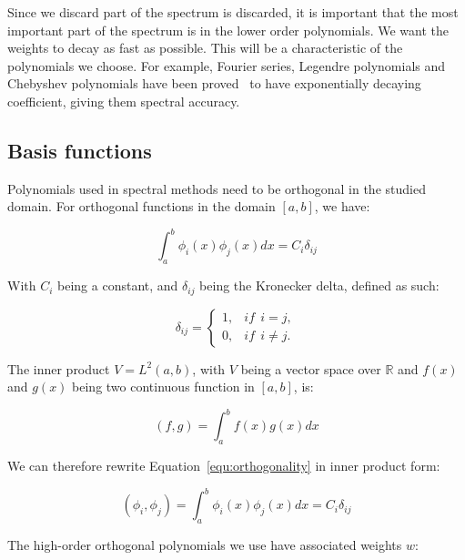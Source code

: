 Since we discard part of the spectrum is discarded, it is important that the most important part of
the spectrum is in the lower order polynomials. We want the weights to decay as fast as possible.
This will be a characteristic of the polynomials we choose. For example, Fourier series, Legendre
polynomials and Chebyshev polynomials have been proved~\cite{Kopriva2009} to have exponentially
decaying coefficient, giving them spectral accuracy.

\subsection{Basis functions} \label{section:spectral_element_method:spectral_approximation:basis_functions}
Polynomials used in spectral methods need to be orthogonal in the studied domain. For orthogonal
functions in the domain $[a, b]$, we have:

\begin{equation} \label{equ:orthogonality}
	\int_{a}^{b}\phi_i(x) \phi_j(x)dx = C_i \delta_{ij}
\end{equation}

With $C_i$ being a constant, and $\delta_{ij}$ being the Kronecker delta, defined as such:

\begin{equation} \label{equ:kronecker}
	\delta _{ij} = \left\{ \begin{matrix}
                    1, & if \:\: i = j,\\ 
                    0, & if \:\: i \neq j.
                    \end{matrix} \right.
\end{equation}

The inner product $V = L^2 \left( a, b \right)$, with $V$ being a vector space over $\mathbb{R}$ and
$f \left( x \right)$ and $g \left( x \right)$ being two continuous function in $\left[ a, b
\right]$, is:

\begin{equation}
    \left( f, g \right) = \int_{a}^{b}f(x)g(x)dx
\end{equation}

We can therefore rewrite Equation~\ref{equ:orthogonality} in inner product form:

\begin{equation}
	\left( \phi_i, \phi_j \right) = \int_{a}^{b}\phi_i(x) \phi_j(x)dx = C_i \delta_{ij}
\end{equation}

The high-order orthogonal polynomials we use have associated weights $w$:

